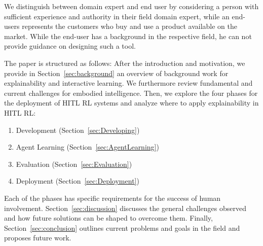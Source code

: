 \documentclass[twoside,11pt]{article}
\begin{document}
We distinguish between domain expert and end user by considering a person with sufficient experience and authority in their field domain expert, while an end-users represents the customers who buy and use a product available on the market. While the end-user has a background in the respective field, he can not provide guidance on designing such a tool.

The paper is structured as follows: After the introduction and motivation, we provide in Section~\ref{sec:background} an overview of background work for explainability and interactive learning. We furthermore review fundamental and current challenges for embodied intelligence. Then, we explore the four phases for the deployment of HITL RL systems and analyze where to apply explainability in HITL RL:
\begin{enumerate}
	\item Development (Section~\ref{sec:Developing})
	\item Agent Learning (Section~\ref{sec:AgentLearning})
	\item Evaluation (Section~\ref{sec:Evaluation})
	\item Deployment (Section~\ref{sec:Deployment})
\end{enumerate}

Each of the phases has specific requirements for the success of human involvement. Section~\ref{sec:discussion} discusses the general challenges observed and how future solutions can be shaped to overcome them. Finally, Section~\ref{sec:conclusion} outlines current problems and goals in the field and proposes future work.
\end{document}
